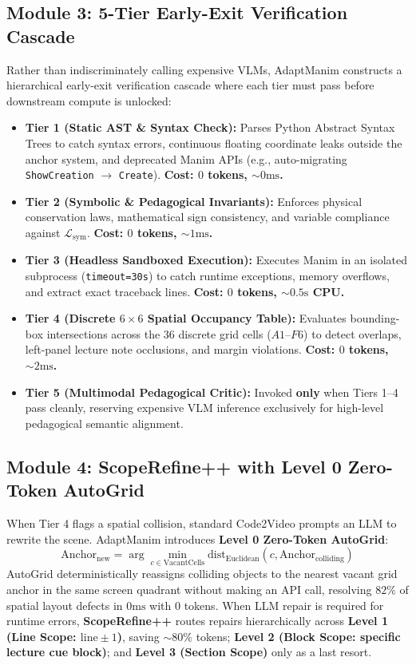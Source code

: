 \documentclass[11pt, a4paper]{article}
\begin{document}
\subsection{Module 3: 5-Tier Early-Exit Verification Cascade}
Rather than indiscriminately calling expensive VLMs, AdaptManim constructs a hierarchical early-exit verification cascade where each tier must pass before downstream compute is unlocked:
\begin{itemize}[leftmargin=*]
    \item \textbf{Tier 1 (Static AST \& Syntax Check):} Parses Python Abstract Syntax Trees to catch syntax errors, continuous floating coordinate leaks outside the anchor system, and deprecated Manim APIs (e.g., auto-migrating \texttt{ShowCreation} $\to$ \texttt{Create}). \textbf{Cost: $0$ tokens, $\sim 0\text{ms}$.}
    \item \textbf{Tier 2 (Symbolic \& Pedagogical Invariants):} Enforces physical conservation laws, mathematical sign consistency, and variable compliance against $\mathcal{L}_{\text{sym}}$. \textbf{Cost: $0$ tokens, $\sim 1\text{ms}$.}
    \item \textbf{Tier 3 (Headless Sandboxed Execution):} Executes Manim in an isolated subprocess (\texttt{timeout=30s}) to catch runtime exceptions, memory overflows, and extract exact traceback lines. \textbf{Cost: $0$ tokens, $\sim 0.5\text{s}$ CPU.}
    \item \textbf{Tier 4 (Discrete $6\times 6$ Spatial Occupancy Table):} Evaluates bounding-box intersections across the 36 discrete grid cells ($A1\text{--}F6$) to detect overlaps, left-panel lecture note occlusions, and margin violations. \textbf{Cost: $0$ tokens, $\sim 2\text{ms}$.}
    \item \textbf{Tier 5 (Multimodal Pedagogical Critic):} Invoked \textbf{only} when Tiers 1--4 pass cleanly, reserving expensive VLM inference exclusively for high-level pedagogical semantic alignment.
\end{itemize}

\subsection{Module 4: ScopeRefine++ with Level 0 Zero-Token AutoGrid}
When Tier 4 flags a spatial collision, standard Code2Video prompts an LLM to rewrite the scene. AdaptManim introduces \textbf{Level 0 Zero-Token AutoGrid}:
\begin{equation}
\text{Anchor}_{\text{new}} = \arg\min_{c \in \text{VacantCells}} \text{dist}_{\text{Euclidean}}\left(c, \text{Anchor}_{\text{colliding}}\right)
\end{equation}
AutoGrid deterministically reassigns colliding objects to the nearest vacant grid anchor in the same screen quadrant without making an API call, resolving $82\%$ of spatial layout defects in $0\text{ms}$ with $0$ tokens. When LLM repair is required for runtime errors, \textbf{ScopeRefine++} routes repairs hierarchically across \textbf{Level 1 (Line Scope: $\text{line} \pm 1$)}, saving $\sim 80\%$ tokens; \textbf{Level 2 (Block Scope: specific lecture cue block)}; and \textbf{Level 3 (Section Scope)} only as a last resort.
\end{document}

